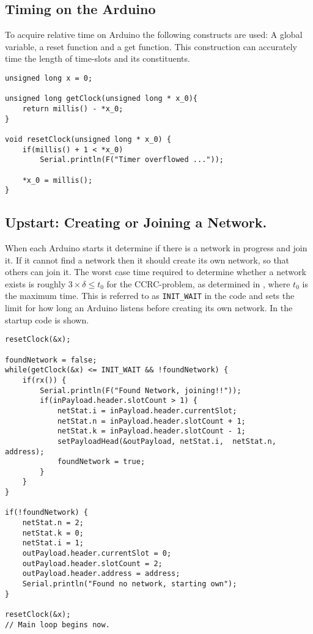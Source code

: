 \subsection{Timing on the Arduino}
To acquire relative time on Arduino the following constructs are used: A global variable, a reset function and a get function. 
This construction can accurately time the length of time-slots and its constituents. 
\begin{lstlisting}[style=customc,caption={The variable and functions used to implement timing.},label={lst:ccrc:timing}]
unsigned long x = 0;

unsigned long getClock(unsigned long * x_0){
    return millis() - *x_0; 
}

void resetClock(unsigned long * x_0) {
    if(millis() + 1 < *x_0)
        Serial.println(F("Timer overflowed ..."));

    *x_0 = millis();
}
\end{lstlisting}

\subsection{Upstart: Creating or Joining a Network.}
When each Arduino starts it determine if there is a network in progress and join it. 
If it cannot find a network then it should create its own network, so that others can join it. 
The worst case time required to determine whether a network exists is roughly $3 \times \delta \leq t_0$ for the CCRC-problem, as determined in , where $t_0$ is the maximum time. 
This is referred to as \texttt{INIT\_WAIT} in the code and sets the limit for how long an Arduino listens before creating its own network. 
In  the startup code is shown. 

\begin{lstlisting}[style=customc,caption={Startup, if a network is found join it, if not create one.},label={lst:ccrc:startup}]
resetClock(&x);

foundNetwork = false;
while(getClock(&x) <= INIT_WAIT && !foundNetwork) {
    if(rx()) {
        Serial.println(F("Found Network, joining!!"));
        if(inPayload.header.slotCount > 1) {
            netStat.i = inPayload.header.currentSlot;
            netStat.n = inPayload.header.slotCount + 1;
            netStat.k = inPayload.header.slotCount - 1;
            setPayloadHead(&outPayload, netStat.i,  netStat.n, address);
            foundNetwork = true;
        }
    }
}

if(!foundNetwork) {
    netStat.n = 2;
    netStat.k = 0;
    netStat.i = 1; 
    outPayload.header.currentSlot = 0;
    outPayload.header.slotCount = 2;
    outPayload.header.address = address;
    Serial.println("Found no network, starting own");
}

resetClock(&x);
// Main loop begins now.
\end{lstlisting}

